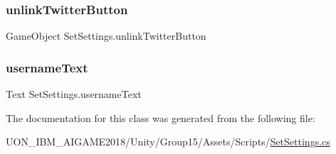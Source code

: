\subsubsection{\texorpdfstring{unlinkTwitterButton}{unlinkTwitterButton}}
{\footnotesize\ttfamily Game\+Object Set\+Settings.\+unlink\+Twitter\+Button\hspace{0.3cm}{\ttfamily [private]}}

\mbox{\label{class_set_settings_a153bac85520244c29722c46cd76eda14}} 
\subsubsection{\texorpdfstring{usernameText}{usernameText}}
{\footnotesize\ttfamily Text Set\+Settings.\+username\+Text\hspace{0.3cm}{\ttfamily [private]}}



The documentation for this class was generated from the following file\+:\begin{DoxyCompactItemize}
\item 
U\+O\+N\+\_\+\+I\+B\+M\+\_\+\+A\+I\+G\+A\+M\+E2018/\+Unity/\+Group15/\+Assets/\+Scripts/\mbox{\hyperlink{_set_settings_8cs}{Set\+Settings.\+cs}}\end{DoxyCompactItemize}
